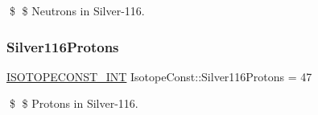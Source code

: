 \$ \$ Neutrons in Silver-\/116. \mbox{\label{group___isotope_const-_silver-_ag116_gac419e59efb51b3c1b01862cd19865f33}} 
\subsubsection{\texorpdfstring{Silver116\+Protons}{Silver116Protons}}
{\footnotesize\ttfamily \mbox{\hyperlink{group___isotope_const-_macros_ga5f18360b3e99483a35c32d789e62621c}{I\+S\+O\+T\+O\+P\+E\+C\+O\+N\+S\+T\+\_\+\+I\+NT}} Isotope\+Const\+::\+Silver116\+Protons = 47}

\$ \$ Protons in Silver-\/116. 